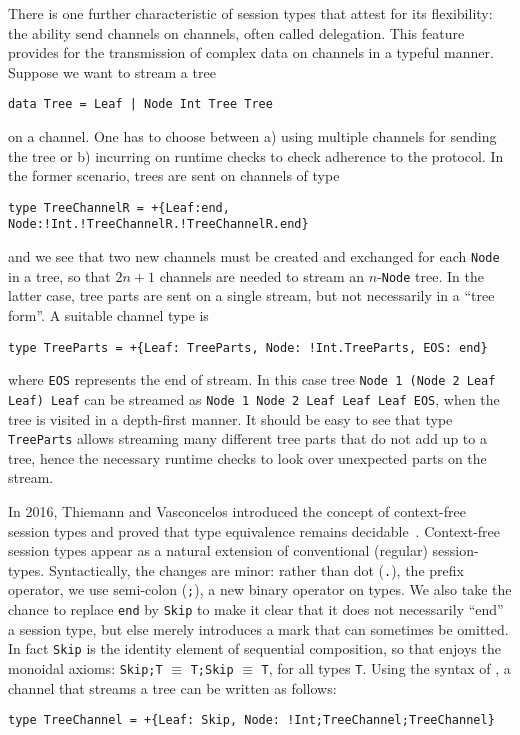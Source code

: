 There is one further characteristic of session types that attest for
its flexibility: the ability send channels on channels, often called
delegation. This feature provides for the transmission of complex data
on channels in a typeful manner. Suppose we want to stream a tree
%
\begin{lstlisting}
data Tree = Leaf | Node Int Tree Tree
\end{lstlisting}
%
on a channel. One has to choose between a) using multiple channels for
sending the tree or b) incurring on runtime checks to check adherence
to the protocol. In the former scenario, trees are sent on channels of
type
%
\begin{lstlisting}[morekeywords=end]
type TreeChannelR = +{Leaf:end, Node:!Int.!TreeChannelR.!TreeChannelR.end}
\end{lstlisting}
%
and we see that two new channels must be created and exchanged for
each \lstinline|Node| in a tree, so that $2n+1$ channels are needed to
stream an $n$-\lstinline|Node| tree.
%
In the latter case, tree parts are sent on a single stream, but not
necessarily in a ``tree form''. A suitable channel type is
%
\begin{lstlisting}[morekeywords=end]
type TreeParts = +{Leaf: TreeParts, Node: !Int.TreeParts, EOS: end}
\end{lstlisting}
%
where \lstinline|EOS| represents the end of stream. In this case tree
\lstinline|Node 1 (Node 2 Leaf Leaf) Leaf| can be streamed as
\lstinline|Node 1 Node 2 Leaf Leaf Leaf EOS|, when the tree is visited
in a depth-first manner. It should be easy to see that type
\lstinline|TreeParts| allows streaming many different tree parts that
do not add up to a tree, hence the necessary runtime checks to look
over unexpected parts on the stream.

In 2016, Thiemann and Vasconcelos introduced the concept of
context-free session types and proved that type equivalence remains
decidable~\cite{DBLP:conf/icfp/ThiemannV16}.
%
Context-free session types appear as a natural extension of
conventional (regular) session-types. Syntactically, the changes are
minor: rather than dot (\lstinline|.|), the prefix operator, we use
semi-colon (\lstinline|;|), a new binary operator on types. We also
take the chance to replace \lstinline [morekeywords=end]|end| by
\lstinline|Skip| to make it clear that it does not necessarily ``end''
a session type, but else merely introduces a mark that can sometimes
be omitted. In fact \lstinline|Skip| is the identity element of
sequential composition, so that \freest{} enjoys the monoidal axioms:
\lstinline|Skip;T| $\equiv$ \lstinline|T;Skip| $\equiv$ \lstinline|T|,
for all types \lstinline|T|.
%
Using the syntax of \freest, a channel that streams a tree can be
written as follows:
%
\begin{lstlisting}
type TreeChannel = +{Leaf: Skip, Node: !Int;TreeChannel;TreeChannel}
\end{lstlisting}

